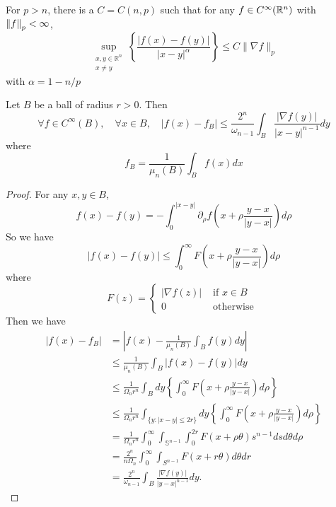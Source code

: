 \begin{enumerate}[label=\Roman*.]
	\begin{thm}\label{thm:sob_p_larg_n}
		For $p > n$, there is a $C = C(n,p)$ such that for any $f \in C^\infty(\mathbb{R}^n)$ with $\left\lVert f\right\lVert_p < \infty$,
		\begin{equation*}
			\sup _{\substack{x, y \in \mathbb{R}^n \\ x \neq y}}\left\{\frac{|f(x)-f(y)|}{|x-y|^\alpha}\right\} \leq C\|\nabla f\|_p
		\end{equation*}
		with $\alpha = 1 - n/p$
	\end{thm}

	\begin{lem}
		Let $B$ be a ball of radius $r > 0$. Then
		\begin{equation*}
			\forall f \in C^{\infty}(B), \quad \forall x \in B, \quad\left|f(x)-f_B\right| \leq \frac{2^n}{\omega_{n-1}} \int_B \frac{|\nabla f(y)|}{|x-y|^{n-1}} d y
		\end{equation*}
		where
		\begin{equation*}
			f_B=\frac{1}{\mu_n(B)} \int_B f(x) d x
		\end{equation*}
	\end{lem}
	\begin{proof}
		For any $x,y \in B$,
		\begin{equation*}
			f(x)-f(y)=-\int_0^{|x-y|} \partial_\rho f\left(x+\rho \frac{y-x}{|y-x|}\right) d \rho
		\end{equation*}
		So we have
		\begin{equation*}
			|f(x)-f(y)| \leq \int_0^{\infty} F\left(x+\rho \frac{y-x}{|y-x|}\right) d \rho
		\end{equation*}
		where
		\begin{equation*}
			F(z)=\left\{\begin{array}{cl}
					|\nabla f(z)| & \text { if } x \in B \\
					0 & \text { otherwise }
				\end{array}\right.
		\end{equation*}
		Then we have
		\begin{equation*}
			\begin{aligned}
				\left|f(x)-f_B\right| & =\left|f(x)-\frac{1}{\mu_n(B)} \int_B f(y) d y\right| \\
				& \leq \frac{1}{\mu_n(B)} \int_B |f(x)-f(y)| d y \\
				& \leq \frac{1}{\Omega_n r^n} \int_B d y\left\{\int_0^{\infty} F\left(x+\rho \frac{y-x}{|y-x|}\right) d \rho\right\} \\
				& \leq \frac{1}{\Omega_n r^n} \int_{\{y:|x-y| \leq 2 r\}} d y\left\{\int_0^{\infty} F\left(x+\rho \frac{y-x}{|y-x|}\right) d \rho\right\} \\
				& =\frac{1}{\Omega_n r^n} \int_0^{\infty} \int_{\mathbb{S}^{n-1}} \int_0^{2 r} F(x+\rho \theta) s^{n-1} d s d \theta d \rho \\
				& =\frac{2^n}{n \Omega_n} \int_0^{\infty} \int_{S^{n-1}} F(x+r \theta) d \theta d r \\
				& =\frac{2^n}{\omega_{n-1}} \int_B \frac{|\nabla f(y)|}{|y-x|^{n-1}} d y .
			\end{aligned}
		\end{equation*}
	\end{proof}


\end{enumerate}
